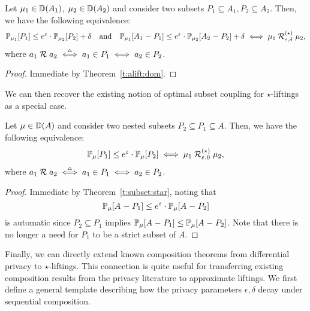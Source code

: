 \documentclass{lmcs}
\begin{document}
\begin{thm} \label{t:subset:star}
  Let $\mu_1 \in {\mathbb{D}}(A_1)$, $\mu_2 \in {\mathbb{D}}(A_2)$ and consider two subsets $P_1
  \subseteq A_1, P_2 \subseteq A_2$. Then, we have the following equivalence:
  \[
    \mathbb{P}_{\mu_1} [{P_1}] \leq e^\varepsilon \cdot \mathbb{P}_{\mu_2} [{P_2}] + \delta
    \quad\text{and}\quad
    \mathbb{P}_{\mu_1} [{A_1 \mathrel{-} P_1}] \leq e^\varepsilon \cdot \mathbb{P}_{\mu_2} [{A_2 \mathrel{-} P_2}] + \delta
    \iff
    \mu_1 \mathrel{\mathrel{\mathcal{R}}^{(\star)}_{\varepsilon, \delta}} \mu_2 ,
  \]
  where
  $a_1 \mathrel{\mathrel{\mathcal{R}}} a_2
    \mathrel{\stackrel{\scriptscriptstyle \triangle}{\iff}} a_1 \in P_1 \iff a_2 \in P_2$.
\end{thm}

\begin{proof}
  Immediate by Theorem~\ref{t:alift:dom}.
\end{proof}

We can then recover the existing notion of optimal subset coupling
\citep{BartheFGGHS16} for $\star$-liftings as a special case.

\begin{cor} \label{c:subset:star}
  Let $\mu \in {\mathbb{D}}(A)$ and consider two nested subsets $P_2 \subseteq P_1
  \subseteq A$.  Then, we have the following equivalence:
  \[
    \mathbb{P}_{\mu} [{P_1}] \leq e^\varepsilon \cdot \mathbb{P}_{\mu} [{P_2}]
    \iff
    \mu_1 \mathrel{\mathrel{\mathcal{R}}^{(\star)}_{\varepsilon, 0}} \mu_2 ,
  \]
  where
  $a_1 \mathrel{\mathrel{\mathcal{R}}} a_2
    \mathrel{\stackrel{\scriptscriptstyle \triangle}{\iff}} a_1 \in P_1 \iff a_2 \in P_2$.
\end{cor}
\begin{proof}
  Immediate by Theorem~\ref{t:subset:star}, noting that
  \[
    \mathbb{P}_{\mu} [{A \mathrel{-} P_1}] \leq e^\varepsilon \cdot \mathbb{P}_{\mu} [{A \mathrel{-} P_2}]
  \]
  is automatic since $P_2 \subseteq P_1$ implies $\mathbb{P}_{\mu} [{A \mathrel{-} P_1}] \leq
  \mathbb{P}_{\mu} [{A \mathrel{-} P_2}]$. Note that there is no longer a need for $P_1$ to
  be a strict subset of $A$.
\end{proof}

Finally, we can directly extend known composition theorems from differential
privacy to $\star$-liftings. This connection is quite useful for transferring
existing composition results from the privacy literature to approximate
liftings. We first define a general template describing how the privacy
parameters $\epsilon, \delta$ decay under sequential composition.
\end{document}
